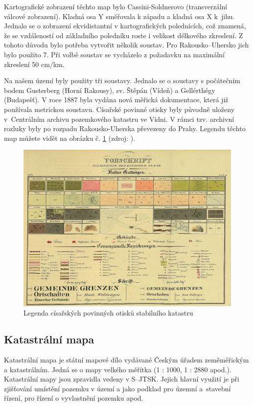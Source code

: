 \documentclass[thesis=M,czech]{FITthesis}[2012/06/26]
\begin{document}
Kartografické zobrazení těchto map bylo Cassini-Soldnerovo (transverzální válcové zobrazení). Kladná osa Y směřovala k západu a kladná osa X k~jihu. Jednalo se o zobrazení ekvidistantní v kartografických polednících, což znamená, že se vzdáleností od základního poledníku roste i velikost délkového zkreslení. Z tohoto důvodu bylo potřeba vytvořit několik soustav. Pro Rakousko–Uhersko jich bylo použito 7. Při volbě soustav se vycházelo z požadavku na maximální zkreslení 50 cm/km. 

Na našem území byly použity tři soustavy. Jednalo se o soustavy s počátečním bodem Gusterberg (Horní Rakousy), sv. Štěpán (Vídeň) a Gellérthégy (Budapešť). V roce 1887 byla vydána nová měřická dokumentace, která již používala metrickou soustavu. Císařské povinné otisky byly původně uloženy v~Centrálním archivu pozemkového katastru ve Vídni. V rámci tzv. archivní rozluky byly po rozpadu Rakousko-Uherska převezeny do Prahy. Legendu těchto map můžete vidět na obrázku č. \ref{obrazek:legenda} (zdroj: \cite{cpo_legenda}). \cite{mapko}


\begin{figure}[h]
	\centering
	\includegraphics[width=13cm]{pics/legenda_CPO.png}
	\caption{Legenda císařských povinných otisků stabilního katastru}
	\label{obrazek:legenda}
\end{figure}

\subsection{Katastrální mapa}
Katastrální mapa je státní mapové dílo vydávané Českým úřadem zeměměřickým a katastrálním. Jedná se o mapy velkého měřítka (1 : 1000, 1 : 2880 apod.). Katastrální mapy jsou zpravidla vedeny v S–JTSK. Jejich hlavní využití je při zjišťování umístění pozemku v území a jako podklad pro územní a~stavební řízení, pro řízení o vyvlastnění pozemku apod. 
\end{document}
